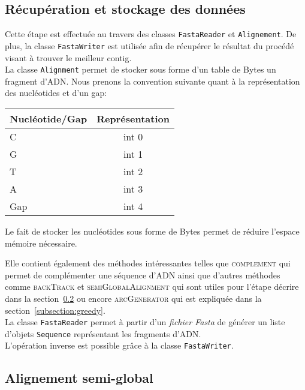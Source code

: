 \subsection{Récupération et stockage des données}
\label{subsection:recStock}

Cette étape est effectuée au travers des classes \verb|FastaReader| et \verb|Alignement|. De plus, la classe \verb|FastaWriter| est utilisée afin de récupérer le résultat du procédé visant à trouver le meilleur contig.\\

La classe \verb|Alignment| permet de stocker sous forme d'un table de Bytes un fragment d'ADN. Nous prenons la convention suivante quant à la représentation des nucléotides et d'un gap:
	\begin{center}
		\begin{tabular}{|l|c|}
			\hline
			Nucléotide/Gap & Représentation \\
			\hline
			\hline
			C & int 0 \\
			\hline
			G & int 1\\
			\hline
			T & int 2 \\
			\hline
			A & int 3 \\
			\hline
			Gap & int 4 \\
			\hline

		\end{tabular}
	\end{center}

	Le fait de stocker les nucléotides sous forme de Bytes permet de réduire l'espace mémoire nécessaire.

	  Elle contient également des méthodes intéressantes telles que \textsc{complement} qui permet de complémenter une séquence d'ADN ainsi que d'autres méthodes comme \textsc{backTrack} et \textsc{semiGlobalAlignment} qui sont utiles pour l'étape décrire dans la section~\ref{subsection:semiGlobal} ou encore \textsc{arcGenerator} qui est expliquée dans la section~\ref{subsection:greedy}.\\

La classe \verb|FastaReader| permet à partir d'un \emph{fichier Fasta} de générer un liste d'objets \verb|Sequence| représentant les fragments d'ADN. \\

L'opération inverse est possible grâce à la classe \verb|FastaWriter|.





\subsection{Alignement semi-global}
\label{subsection:semiGlobal}

